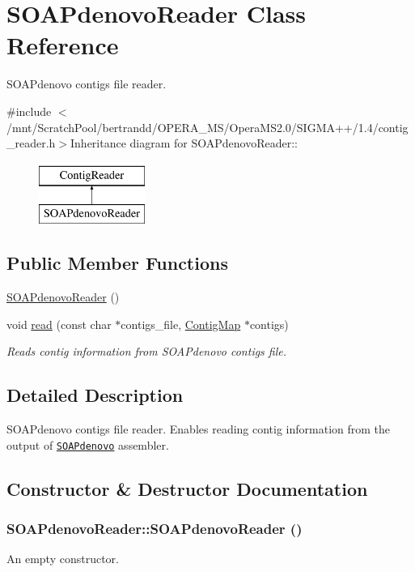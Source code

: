 \hypertarget{classSOAPdenovoReader}{
\section{SOAPdenovoReader Class Reference}
\label{classSOAPdenovoReader}
}


SOAPdenovo contigs file reader.  


{\ttfamily \#include $<$/mnt/ScratchPool/bertrandd/OPERA\_\-MS/OperaMS2.0/SIGMA++/1.4/contig\_\-reader.h$>$}Inheritance diagram for SOAPdenovoReader::\begin{figure}[H]
\begin{center}
\leavevmode
\includegraphics[height=2cm]{classSOAPdenovoReader}
\end{center}
\end{figure}
\subsection*{Public Member Functions}
\begin{DoxyCompactItemize}
\item 
\hyperlink{classSOAPdenovoReader_a29602e21bd8d8f21800eecbf13530331}{SOAPdenovoReader} ()
\item 
void \hyperlink{classSOAPdenovoReader_a308a9eb5c0b557c98705eaa4bd6626f7}{read} (const char $\ast$contigs\_\-file, \hyperlink{contig_8h_aa2acb8d3b78def617ec4509a1f684c4e}{ContigMap} $\ast$contigs)
\begin{DoxyCompactList}\small\item\em Reads contig information from SOAPdenovo contigs file. \item\end{DoxyCompactList}\end{DoxyCompactItemize}


\subsection{Detailed Description}
SOAPdenovo contigs file reader. Enables reading contig information from the output of \href{http://soap.genomics.org.cn/soapdenovo.html}{\tt SOAPdenovo} assembler. 

\subsection{Constructor \& Destructor Documentation}
\hypertarget{classSOAPdenovoReader_a29602e21bd8d8f21800eecbf13530331}{
\subsubsection[{SOAPdenovoReader}]{\setlength{\rightskip}{0pt plus 5cm}SOAPdenovoReader::SOAPdenovoReader ()}}
\label{classSOAPdenovoReader_a29602e21bd8d8f21800eecbf13530331}
An empty constructor. 

